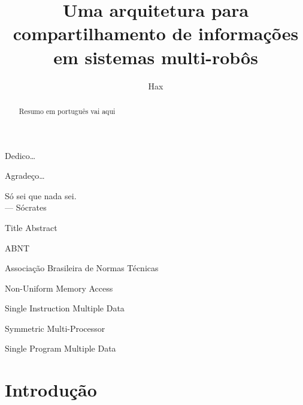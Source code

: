 \documentclass[eq,capa]{texufpel}
\title{Uma arquitetura para compartilhamento de informações em sistemas multi-robôs}
\author{Hax}{Vinícius Alves}
\begin{document}

\maketitle 

\sloppy

\begin{dedicatoria}
  Dedico\ldots 
\end{dedicatoria}

\begin{agradecimentos}
  Agradeço\ldots 
\end{agradecimentos}

\begin{epigrafe}
  Só sei que nada sei.\\
  {\sc --- Sócrates}
\end{epigrafe}

\begin{abstract}
Resumo em português vai aqui
\end{abstract}

\begin{englishabstract}{Title}
Abstract
\end{englishabstract}

\listoffigures

\listoftables

\begin{listofabbrv}{ABNT}%
        \item[ABNT] Associação Brasileira de Normas Técnicas
        \item[NUMA] Non-Uniform Memory Access
        \item[SIMD] Single Instruction Multiple Data
        \item[SMP] Symmetric Multi-Processor
        \item[SPMD] Single Program Multiple Data
\end{listofabbrv}

\tableofcontents

\chapter{Introdução}
\end{document}
